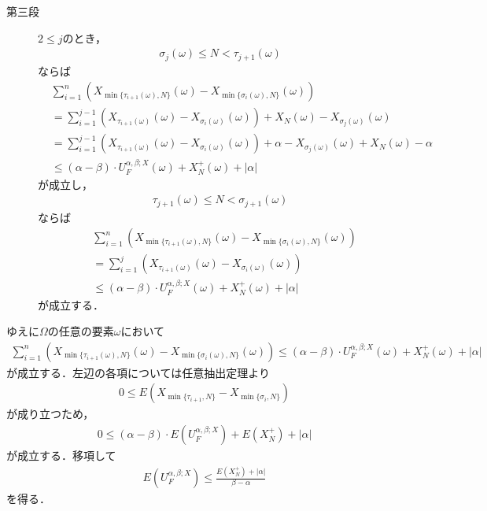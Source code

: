 \begin{description}
 		\item[第三段]
 			$2 \leq j$のとき，
 			\begin{align}
 				\sigma_j(\omega) \leq N < \tau_{j+1}(\omega)
 			\end{align}
 			ならば
 			\begin{align}
 				&\sum_{i=1}^n \left( X_{\min{}{\{\tau_{i+1}(\omega),N\}}}(\omega) - X_{\min{}{\{\sigma_i(\omega),N\}}}(\omega) \right) \\
 				&= \sum_{i=1}^{j-1} \left( X_{\tau_{i+1}(\omega)}(\omega) - X_{\sigma_i(\omega)}(\omega) \right)
 				+ X_N(\omega) - X_{\sigma_j(\omega)}(\omega) \\
 				&= \sum_{i=1}^{j-1} \left( X_{\tau_{i+1}(\omega)}(\omega) - X_{\sigma_i(\omega)}(\omega) \right)
 				+ \alpha - X_{\sigma_j(\omega)}(\omega) + X_N(\omega) - \alpha \\
 				&\leq (\alpha-\beta) \cdot U_F^{\alpha,\beta;X}(\omega) + X_N^+(\omega) + |\alpha|
 			\end{align}
 			が成立し， 	
 			\begin{align}
 				\tau_{j+1}(\omega) \leq N < \sigma_{j+1}(\omega)
 			\end{align}
 			ならば
 			\begin{align}
 				&\sum_{i=1}^n \left( X_{\min{}{\{\tau_{i+1}(\omega),N\}}}(\omega) - X_{\min{}{\{\sigma_i(\omega),N\}}}(\omega) \right) \\
 				&= \sum_{i=1}^{j} \left( X_{\tau_{i+1}(\omega)}(\omega) - X_{\sigma_i(\omega)}(\omega) \right) \\
 				&\leq (\alpha-\beta) \cdot U_F^{\alpha,\beta;X}(\omega) + X_N^+(\omega) + |\alpha|
 			\end{align}
 			が成立する．
 	\end{description}
 		
 	ゆえに$\Omega$の任意の要素$\omega$において
 	\begin{align}
 		\sum_{i=1}^n \left( X_{\min{}{\{\tau_{i+1}(\omega),N\}}}(\omega) - X_{\min{}{\{\sigma_i(\omega),N\}}}(\omega) \right)
 		\leq (\alpha-\beta) \cdot U_F^{\alpha,\beta;X}(\omega) + X_N^+(\omega) + |\alpha|
 	\end{align}
 	が成立する．左辺の各項については任意抽出定理より
 	\begin{align}
 		0 \leq E\left(X_{\min{}{\{\tau_{i+1},N\}}} - X_{\min{}{\{\sigma_i,N\}}}\right)
 	\end{align}
 	が成り立つため，
 	\begin{align}
 		0 \leq (\alpha-\beta) \cdot E\left(U_F^{\alpha,\beta;X}\right) + E(X_N^+) + |\alpha|
 	\end{align}
 	が成立する．移項して
 	\begin{align}
 		E\left( U_F^{\alpha,\beta;X} \right) \leq \frac{E(X_N^+) + |\alpha|}{\beta - \alpha}
 	\end{align}
 	を得る．
 	\QED